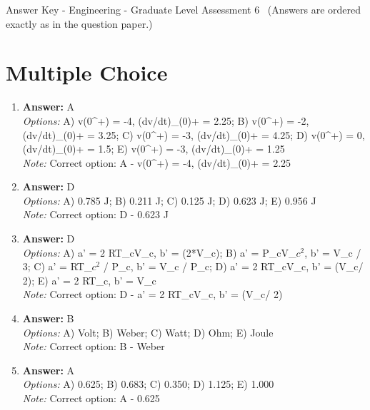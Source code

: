 \documentclass[12pt]{article}
\begin{document}
\begin{center}
Answer Key - Engineering - Graduate Level Assessment 6 \
\small (Answers are ordered exactly as in the question paper.)
\end{center}

\section*{Multiple Choice}
\begin{enumerate}[label=\arabic*.]
\item \textbf{Answer:} A
\\ \textit{Options:} A) v(0^+) = -4, (dv/dt)\_(0)+ = 2.25; B) v(0^+) = -2, (dv/dt)\_(0)+ = 3.25; C) v(0^+) = -3, (dv/dt)\_(0)+ = 4.25; D) v(0^+) = 0, (dv/dt)\_(0)+ = 1.5; E) v(0^+) = -3, (dv/dt)\_(0)+ = 1.25
\\ \textit{Note:} Correct option: A - v(0^+) = -4, (dv/dt)\_(0)+ = 2.25
\item \textbf{Answer:} D
\\ \textit{Options:} A) 0.785 J; B) 0.211 J; C) 0.125 J; D) 0.623 J; E) 0.956 J
\\ \textit{Note:} Correct option: D - 0.623 J
\item \textbf{Answer:} D
\\ \textit{Options:} A) a' = 2 RT\_cV\_c, b' = (2*V\_c); B) a' = P\_cV\_$c^2$, b' = V\_c / 3; C) a' = RT\_$c^2$ / P\_c, b' = V\_c / P\_c; D) a' = 2 RT\_cV\_c, b' = (V\_c/ 2); E) a' = 2 RT\_c, b' = V\_c
\\ \textit{Note:} Correct option: D - a' = 2 RT\_cV\_c, b' = (V\_c/ 2)
\item \textbf{Answer:} B
\\ \textit{Options:} A) Volt; B) Weber; C) Watt; D) Ohm; E) Joule
\\ \textit{Note:} Correct option: B - Weber
\item \textbf{Answer:} A
\\ \textit{Options:} A) 0.625; B) 0.683; C) 0.350; D) 1.125; E) 1.000
\\ \textit{Note:} Correct option: A - 0.625
\end{enumerate}
\end{document}
